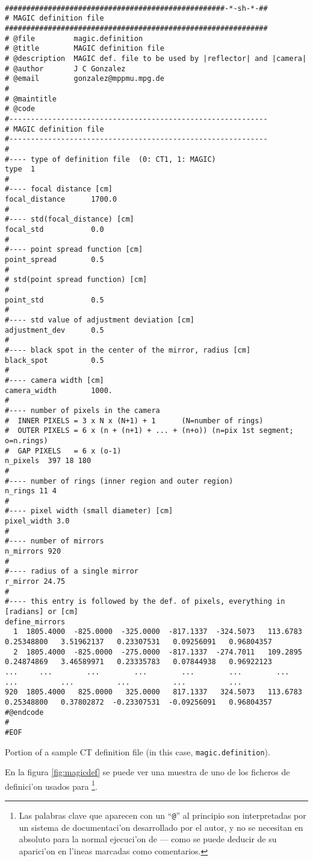 \begin{listado}
  \tiny
\begin{verbatim}

###################################################-*-sh-*-##
# MAGIC definition file
#############################################################
# @file         magic.definition
# @title        MAGIC definition file
# @description  MAGIC def. file to be used by |reflector| and |camera|
# @author       J C Gonzalez
# @email        gonzalez@mppmu.mpg.de
#
# @maintitle
# @code
#------------------------------------------------------------ 
# MAGIC definition file
#------------------------------------------------------------
#
#---- type of definition file  (0: CT1, 1: MAGIC)
type  1
#
#---- focal distance [cm]
focal_distance      1700.0
#
#---- std(focal_distance) [cm]
focal_std           0.0
#
#---- point spread function [cm]
point_spread        0.5
#
# std(point spread function) [cm]
#
point_std           0.5
#
#---- std value of adjustment deviation [cm]
adjustment_dev      0.5
#
#---- black spot in the center of the mirror, radius [cm]
black_spot          0.5
#
#---- camera width [cm]
camera_width        1000.
#
#---- number of pixels in the camera 
#  INNER PIXELS = 3 x N x (N+1) + 1      (N=number of rings)
#  OUTER PIXELS = 6 x (n + (n+1) + ... + (n+o)) (n=pix 1st segment; o=n.rings)
#  GAP PIXELS   = 6 x (o-1)
n_pixels  397 18 180 
#
#---- number of rings (inner region and outer region)
n_rings 11 4 
#
#---- pixel width (small diameter) [cm] 
pixel_width 3.0
#
#---- number of mirrors
n_mirrors 920
#
#---- radius of a single mirror
r_mirror 24.75
#
#---- this entry is followed by the def. of pixels, everything in [radians] or [cm]
define_mirrors
  1  1805.4000  -825.0000  -325.0000  -817.1337  -324.5073   113.6783   0.25348800   3.51962137   0.23307531   0.09256091   0.96804357
  2  1805.4000  -825.0000  -275.0000  -817.1337  -274.7011   109.2895   0.24874869   3.46589971   0.23335783   0.07844938   0.96922123
...     ...        ...        ...        ...        ...        ...        ...          ...          ...          ...          ...
920  1805.4000   825.0000   325.0000   817.1337   324.5073   113.6783   0.25348800   0.37802872  -0.23307531  -0.09256091   0.96804357
#@endcode
#
#EOF
\end{verbatim}
  \caption{Portion of a sample CT definition file (in this case, 
    \texttt{magic.definition}).}
  \label{fig:magicdef}
\end{listado}

En la figura \ref{fig:magicdef} se puede ver una muestra de uno de los
ficheros de definici'on usados para \MAGIC\footnote{Las palabras clave
  que aparecen con un ``\texttt{@}'' al principio son interpretadas
  por un sistema de documentaci'on desarrollado por el autor, y no se
  necesitan en absoluto para la normal ejecuci'on de  ---
  como se puede deducir de su aparici'on en l'ineas marcadas como
  comentarios.}.

